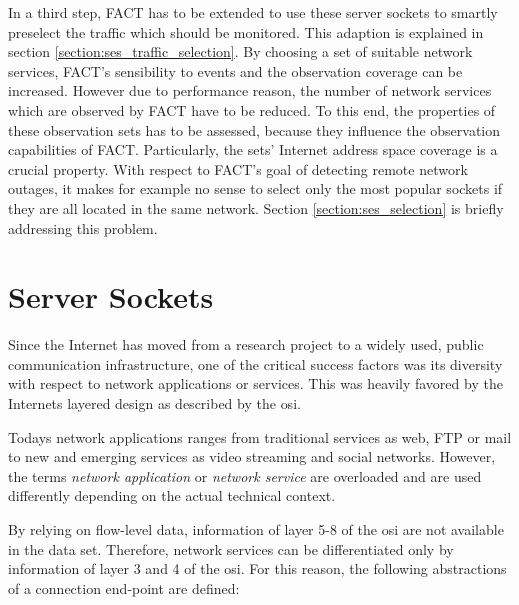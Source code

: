 In a third step, FACT has to be extended to use these server sockets to smartly preselect the traffic which should be monitored. 
This adaption is explained in section \ref{section:ses_traffic_selection}. 
By choosing a set of suitable network services, \gls{FACT}'s sensibility to events and the observation coverage can be increased. 
However due to performance reason, the number of network services which are observed by \gls{FACT} have to be reduced. 
To this end, the properties of these observation sets has to be assessed, because they influence the observation capabilities of \gls{FACT}. 
Particularly, the sets' Internet address space coverage is a crucial property. 
With respect to FACT's goal of detecting remote network outages, it makes for example no sense to select only the most popular sockets if they are all located in the same network. 
Section \ref{section:ses_selection} is briefly addressing this problem.

\section{Server Sockets}
Since the Internet has moved from a research project to a widely used, public communication infrastructure, one of the critical success factors was its diversity with respect to network applications or services. This was heavily favored by the Internets layered design as described by the \gls{osi}.

Todays network applications ranges from traditional services as web, \gls{FTP} or mail to new and emerging services as video streaming and social networks. However, the terms \emph{network application} or \emph{network service} are overloaded and are used differently depending on the actual technical context.

By relying on flow-level data, information of layer 5-8 of the \gls{osi} are not available in the data set. Therefore, network services can be differentiated only by information of layer 3 and 4 of the \gls{osi}. For this reason, the following abstractions of a connection end-point are defined:

